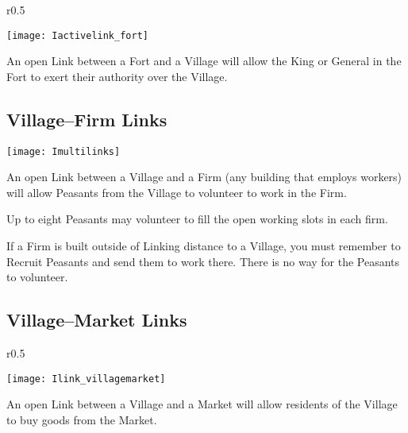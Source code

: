 
\begin{wrapfigure}{r}{0.5\textwidth}
	\vspace{-20pt}
	\begin{center}
		\texttt{[image: Iactivelink\_fort]}
	\end{center}
	\vspace{-20pt}
\end{wrapfigure}

An open Link between a Fort and a Village will allow the King or General in the Fort to exert their authority over the Village.

\subsection{Village–Firm Links}

\begin{center}
	\texttt{[image: Imultilinks]}
\end{center}

An open Link between a Village and a Firm (any building that employs workers) will allow Peasants from the Village to volunteer to work in the Firm.

Up to eight Peasants may volunteer to fill the open working slots in each firm.

If a Firm is built outside of Linking distance to a Village, you must remember to Recruit Peasants and send them to work there. There is no way for the Peasants to volunteer.


\subsection{Village–Market Links}

\begin{wrapfigure}{r}{0.5\textwidth}
	\vspace{-20pt}
	\begin{center}
		\texttt{[image: Ilink\_villagemarket]}
	\end{center}
	\vspace{-20pt}
	\vspace{-10pt}
\end{wrapfigure}

An open Link between a Village and a Market will allow residents of the Village to buy goods from the Market.

